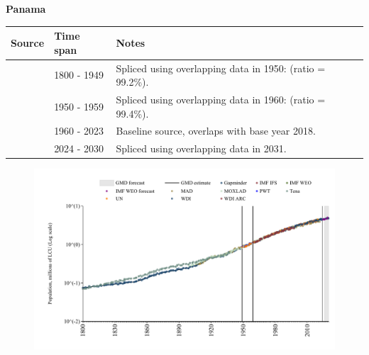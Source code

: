\documentclass[12pt,a4paper,landscape]{article}
\begin{document}
\begin{adjustbox}{max totalsize={\paperwidth}{\paperheight},center}
\begin{minipage}[t][\textheight][t]{\textwidth}
\vspace*{0.5cm}
{}
\begin{center}
{\Large\bfseries Panama}
\end{center}
\vspace{0.5cm}
\begin{table}[H]
\centering
\small
\begin{tabular}{|l|l|l|}
\hline
\textbf{Source} & \textbf{Time span} & \textbf{Notes} \\
\hline
\rowcolor{white}\cite{Gapminder}& 1800 - 1949 &Spliced using overlapping data in 1950: (ratio = 99.2\%).\\
\rowcolor{lightgray}\cite{IMF_IFS}& 1950 - 1959 &Spliced using overlapping data in 1960: (ratio = 99.4\%).\\
\rowcolor{white}\cite{WDI}& 1960 - 2023 &Baseline source, overlaps with base year 2018.\\
\rowcolor{lightgray}\cite{Gapminder}& 2024 - 2030 &Spliced using overlapping data in 2031.\\
\hline
\end{tabular}
\end{table}
\begin{figure}[H]
\centering
\includegraphics[width=\textwidth,height=0.6\textheight,keepaspectratio]{graphs/PAN_pop.pdf}
\end{figure}
\end{minipage}
\end{adjustbox}
\end{document}
